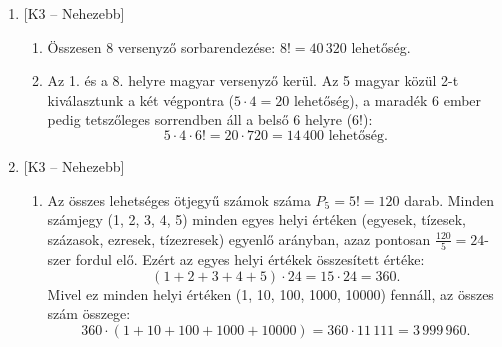 \documentclass[12pt,a4paper]{article}
\begin{document}
\begin{enumerate}[label=\arabic*., leftmargin=*]
    \vspace{0.3cm}

    \item \textsf{\small [K3 – Nehezebb]}
    \begin{enumerate}[label=\alph*)]
        \item Összesen 8 versenyző sorbarendezése: $8! = 40\,320$ lehetőség.
        \item Az 1. és a 8. helyre magyar versenyző kerül. Az 5 magyar közül 2-t kiválasztunk a két végpontra ($5 \cdot 4 = 20$ lehetőség), a maradék 6 ember pedig tetszőleges sorrendben áll a belső 6 helyre ($6!$):
        \[
        5 \cdot 4 \cdot 6! = 20 \cdot 720 = 14\,400 \text{ lehetőség.}
        \]
    \end{enumerate}

    \vspace{0.3cm}

    \item \textsf{\small [K3 – Nehezebb]}
    \begin{enumerate}[label=\alph*)]
        \item Az összes lehetséges ötjegyű számok száma $P_5 = 5! = 120$ darab. 
        Minden számjegy (1, 2, 3, 4, 5) minden egyes helyi értéken (egyesek, tízesek, százasok, ezresek, tízezresek) egyenlő arányban, azaz pontosan $\frac{120}{5} = 24$-szer fordul elő.
        Ezért az egyes helyi értékek összesített értéke:
        \[
        (1 + 2 + 3 + 4 + 5) \cdot 24 = 15 \cdot 24 = 360.
        \]
        Mivel ez minden helyi értéken (1, 10, 100, 1000, 10000) fennáll, az összes szám összege:
        \[
        360 \cdot (1 + 10 + 100 + 1000 + 10000) = 360 \cdot 11\,111 = 3\,999\,960.
        \]
    \end{enumerate}

\end{enumerate}
\end{document}
